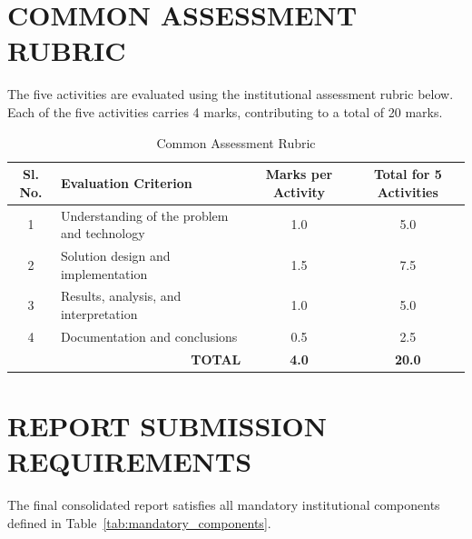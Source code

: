 \documentclass[12pt,a4paper]{report}
\begin{document}
\appendix
\chapter{COMMON ASSESSMENT RUBRIC}

The five activities are evaluated using the institutional assessment rubric below. Each of the five activities carries 4 marks, contributing to a total of 20 marks.

\begin{table}[H]
\centering
\caption{Common Assessment Rubric}
\label{tab:common_rubric}
\begin{tabularx}{\textwidth}{|c|X|c|c|}
\hline
\textbf{Sl. No.} & \textbf{Evaluation Criterion} & \textbf{Marks per Activity} & \textbf{Total for 5 Activities}\\
\hline
1 & Understanding of the problem and technology & 1.0 & 5.0\\
\hline
2 & Solution design and implementation & 1.5 & 7.5\\
\hline
3 & Results, analysis, and interpretation & 1.0 & 5.0\\
\hline
4 & Documentation and conclusions & 0.5 & 2.5\\
\hline
\multicolumn{2}{|r|}{\textbf{TOTAL}} & \textbf{4.0} & \textbf{20.0}\\
\hline
\end{tabularx}
\end{table}

\chapter{REPORT SUBMISSION REQUIREMENTS}

The final consolidated report satisfies all mandatory institutional components defined in Table~\ref{tab:mandatory_components}.
\end{document}
